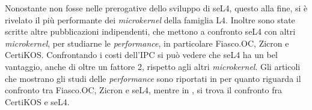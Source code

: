 Nonostante non fosse nelle prerogative dello sviluppo di seL4, questo alla fine, si è rivelato il più performante dei \textit{microkernel} della famiglia L4. Inoltre sono state scritte altre pubblicazioni indipendenti, che mettono a confronto seL4 con altri \textit{microkernel}, per studiarne le \textit{performance}, in particolare Fiasco.OC, Zicron e CertiKOS. Confrontando i costi dell'IPC si può vedere che seL4 ha un bel vantaggio, anche di oltre un fattore 2, rispetto agli altri \textit{microkernel}.
Gli articoli che mostrano gli studi delle \textit{performance} sono riportati in \cite{skybridge} per quanto riguarda il confronto tra Fiasco.OC, Zicron e seL4, mentre in \cite{CertiKOS}, si trova il confronto fra CertiKOS e seL4.